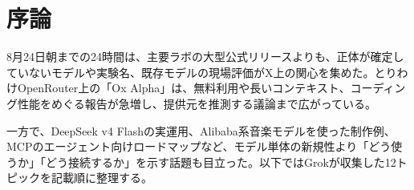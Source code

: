 \section*{序論}
8月24日朝までの24時間は、主要ラボの大型公式リリースよりも、正体が確定していないモデルや実験名、既存モデルの現場評価がX上の関心を集めた。とりわけOpenRouter上の「Ox Alpha」は、無料利用や長いコンテキスト、コーディング性能をめぐる報告が急増し、提供元を推測する議論まで広がっている。

一方で、DeepSeek v4 Flashの実運用、Alibaba系音楽モデルを使った制作例、MCPのエージェント向けロードマップなど、モデル単体の新規性より「どう使うか」「どう接続するか」を示す話題も目立った。以下ではGrokが収集した12トピックを記載順に整理する。
